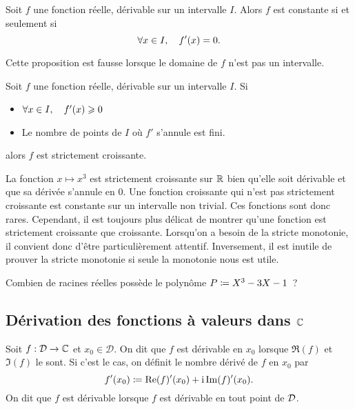 \documentclass{magnolia}
\begin{document}
\begin{proposition}[utile=3]
Soit $f$ une fonction réelle, dérivable sur un intervalle $I$. Alors $f$ est
constante si et seulement si
\[\forall x\in I ,\quad f'(x)=0.\]
\end{proposition}

\begin{remarqueUnique}
\remarque Cette proposition est fausse lorsque le domaine de 
  $f$ n'est pas un intervalle. 
\end{remarqueUnique}

\begin{proposition}[utile=2]
Soit $f$ une fonction réelle, dérivable sur un intervalle $I$. Si
\begin{itemize}
\item $\forall x\in I ,\quad f'(x)\geqslant 0$
\item Le nombre de points de $I$ où $f'$ s'annule est fini.
\end{itemize}
alors $f$ est strictement croissante.
\end{proposition}

\begin{remarques}
\remarque La fonction $x\mapsto x^3$ est strictement croissante sur $\mathbb{R}$ bien
  qu'elle soit dérivable et que sa dérivée s'annule en 0.
\remarque Une fonction croissante qui n'est pas strictement croissante est constante sur un intervalle non trivial. Ces fonctions sont donc rares. Cependant, il est toujours plus délicat de montrer qu'une fonction est strictement croissante que croissante. Lorsqu'on a besoin de la stricte monotonie, il convient donc d'être particulièrement attentif. Inversement, il est inutile de prouver la stricte monotonie si seule la monotonie nous est utile.
\end{remarques}

\begin{exoUnique}
\exo Combien de racines réelles possède le polynôme $P\coloneqq X^3-3X-1$~?
\end{exoUnique}


\subsection{Dérivation des fonctions à valeurs dans $\mathbb{C}$}

\begin{definition}[utile=-3]
Soit $f:\mathcal{D}\to\mathbb{C}$ et $x_0\in\mathcal{D}$. On dit que $f$ est dérivable en $x_0$ lorsque $\Re(f)$ et $\Im(f)$ le sont. Si c'est le cas, on définit le nombre dérivé de $f$ en $x_0$ par
\[f'(x_0)\coloneqq \mathop{\rm Re}(f)'(x_0)+{\rm i} \mathop{\rm Im}(f)'(x_0).\]
On dit que $f$ est dérivable lorsque $f$ est dérivable en tout point de $\mathcal{D}$.
\end{definition}
\end{document}
